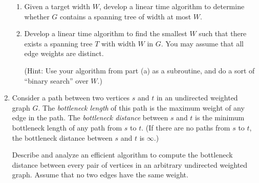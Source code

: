 \documentclass{article}
\begin{document}
\begin{enumerate}
  \begin{enumerate}
	  \item Given a target width $W$, develop a linear time algorithm to
determine whether $G$ contains a spanning tree of width at most $W$.

		 \item Develop a linear time algorithm to find the smallest $W$ such
that there exists a spanning tree $T$ with width $W$ in $G$. You may assume
that all edge weights are distinct.

    (Hint: Use your algorithm from part (a) as a subroutine, and do a
    sort of ``binary search'' over $W$.)
   
\end{enumerate}

%
	\item  Consider a path between two vertices $s$ and $t$ in an undirected
weighted graph $G$. The \emph{bottleneck length} of this path is the maximum
weight of any edge in the path. The \emph{bottleneck distance} between $s$ and
$t$ is the minimum bottleneck length of any path from $s$ to $t$. (If there are
no paths from $s$ to $t$, the bottleneck distance between $s$ and $t$ is
$\infty$.)

Describe and analyze an efficient algorithm to compute the bottleneck distance between every pair of vertices
in an arbitrary undirected weighted graph. Assume that no two edges have the same
weight.


\end{enumerate}
\end{document}
